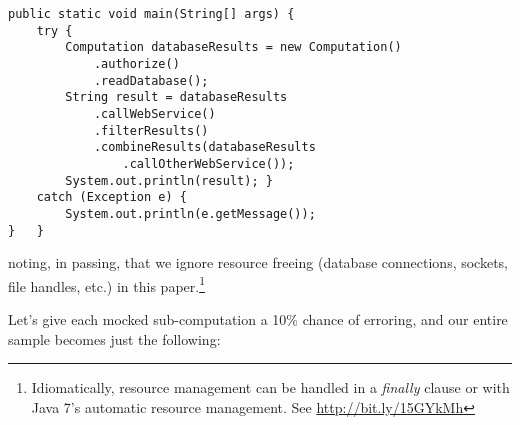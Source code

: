 \documentclass[11pt]{article}
\begin{document}
\begin{verbatim}
public static void main(String[] args) {
    try {
        Computation databaseResults = new Computation()
            .authorize()
            .readDatabase();
        String result = databaseResults
            .callWebService()
            .filterResults()
            .combineResults(databaseResults
                .callOtherWebService());
        System.out.println(result); }
    catch (Exception e) {
        System.out.println(e.getMessage());
}   }
\end{verbatim}
noting, in passing, that we ignore resource freeing (database
connections, sockets, file handles, etc.) in this
paper.\footnote{Idiomatically, resource management can be handled in a
   \emph{finally} clause or with Java 7's automatic resource management.
   See \url{http://bit.ly/15GYkMh}}

Let's give each mocked sub-computation a \mbox{10\%} chance of
erroring, and our entire sample becomes just the following:
\end{document}
